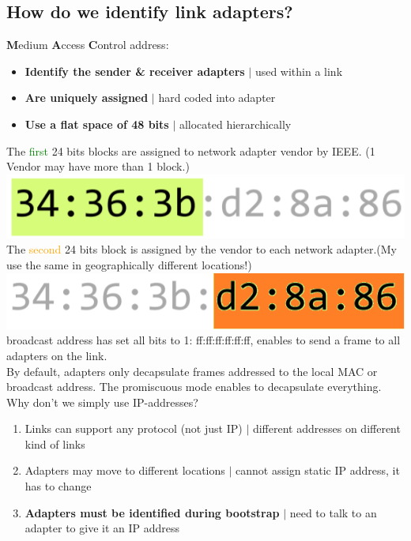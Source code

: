 \documentclass[a4paper, fontsize=8pt, landscape, DIV=1]{scrartcl}
\begin{document}
\begin{multicols*}{4}
   			\subsection{How do we identify link adapters?}
   			\textbf{M}edium \textbf{A}ccess \textbf{C}ontrol address:
   			\vspace{-0.2cm}
   			\begin{itemize}[noitemsep]
   				\item \textbf{Identify the sender \& receiver adapters} $\vert$ used within a link
   				\item \textbf{Are uniquely assigned} $\vert$ hard coded into adapter
   				\item \textbf{Use a flat space of 48 bits} $\vert$ allocated hierarchically 
   			\end{itemize}
   			The \textcolor{Green}{first} 24 bits blocks are assigned to network adapter vendor by IEEE. (1 Vendor may have more than 1 block.)
   			\includegraphics[width=\columnwidth]{images/Link_Layer/first_mac_block.png}
   			The \textcolor{Orange}{second} 24 bits block is assigned by the vendor to each network adapter.(My use the same in geographically different locations!)
   			\includegraphics[width=\columnwidth]{images/Link_Layer/second_mac_block.png}
   			broadcast address has set all bits to 1: ff:ff:ff:ff:ff:ff, enables to send a frame to all adapters on the link.\\
   			By default, adapters only decapsulate frames addressed to the local MAC or broadcast address. The promiscuous mode enables to decapsulate everything.\\
   			Why don't we simply use IP-addresses?
   			\begin{enumerate}[noitemsep]
   				\item Links can support any protocol (not just IP) $\vert$ different addresses on different kind of links
   				\item Adapters may move to different locations $\vert$ cannot assign static IP address, it has to change
   				\item \textbf{Adapters must be identified during bootstrap} $\vert$ need to talk to an adapter to give it an IP address 

\end{enumerate}
\end{multicols*}
\end{document}
